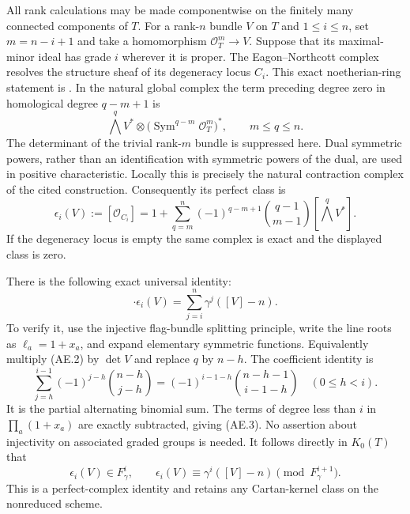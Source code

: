 All rank calculations may be made componentwise on the finitely
many connected components of $T$.
For a rank-$n$ bundle $V$ on $T$ and $1\leq i\leq n$, set
$m=n-i+1$ and take a homomorphism $\mathcal O_T^m\to V$.
Suppose that its maximal-minor ideal has grade $i$ wherever it is
proper.  The Eagon--Northcott complex resolves the structure sheaf
of its degeneracy locus $C_i$.  This exact noetherian-ring statement
is \citet[Theorem 2.16, pp.~18--20; construction in Section 2.C,
pp.~16--18]{D_BrunsVetter1988Determinantal}.
In the natural global complex the term preceding degree zero in
homological degree $q-m+1$ is
\[
 \bigwedge^q V^*\otimes
       \bigl(\operatorname{Sym}^{q-m}\mathcal O_T^m\bigr)^*,
                       \qquad m\leq q\leq n.
\]
The determinant of the trivial rank-$m$ bundle is suppressed here.
Dual symmetric powers, rather than an identification with symmetric
powers of the dual, are used in positive characteristic.  Locally
this is precisely the natural contraction complex of the cited
construction.  Consequently its perfect class is
\begin{equation}
 \epsilon_i(V):=[\mathcal O_{C_i}]
  =1+\sum_{q=m}^n(-1)^{q-m+1}
       {q-1\choose m-1}[\bigwedge^qV^*].               \tag{AE.2}
\end{equation}
If the degeneracy locus is empty the same complex is exact and
the displayed class is zero.

There is the following exact universal identity:
\begin{equation}
       [\det V]\cdot\epsilon_i(V)
               =\sum_{j=i}^n\gamma^j([V]-n).          \tag{AE.3}
\end{equation}
To verify it, use the injective flag-bundle splitting principle,
write the line roots as $\ell_a=1+x_a$, and expand elementary
symmetric functions.  Equivalently multiply (AE.2) by $\det V$
and replace $q$ by $n-h$.  The coefficient identity is
\[
 \sum_{j=h}^{i-1}(-1)^{j-h}{n-h\choose j-h}
       =(-1)^{i-1-h}{n-h-1\choose i-1-h}
                  \quad(0\leq h<i).
\]
It is the partial alternating binomial sum.  The terms of degree
less than $i$ in $\prod_a(1+x_a)$ are exactly subtracted, giving
(AE.3).  No assertion about injectivity on associated graded groups
is needed.  It follows directly in $K_0(T)$ that
\begin{equation}
 \epsilon_i(V)\in F_\gamma^i,
 \qquad \epsilon_i(V)\equiv\gamma^i([V]-n)
                             \pmod {F_\gamma^{i+1}}.   \tag{AE.4}
\end{equation}
This is a perfect-complex identity and retains any Cartan-kernel
class on the nonreduced scheme.

